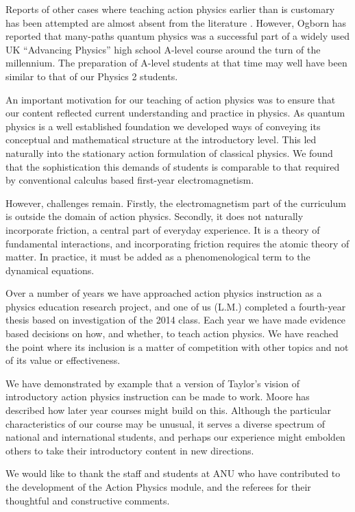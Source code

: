 \documentclass[prb,oncolumn,12pt]{revtex4-2}
\begin{document}
Reports of other cases where teaching action physics earlier than is customary has been attempted are almost absent from the literature \cite{Taylor2003}. However, Ogborn has reported that many-paths quantum physics was a successful part of a widely used UK ``Advancing Physics'' high school A-level course around the turn of the millennium. \cite{OgbornGirep2006} The preparation of A-level students at that time may well have been similar to that of our Physics 2 students.

An important motivation for our teaching of action physics was to ensure that our content reflected current understanding and practice in physics. As quantum physics is a well established foundation we developed ways of conveying its conceptual and mathematical structure at the introductory level. This led naturally into the stationary action formulation of classical physics. We found that the sophistication this demands of students is comparable to that required by conventional calculus based first-year electromagnetism.

However, challenges remain. Firstly, the electromagnetism part of the curriculum is outside the domain of action physics. Secondly, it does not naturally incorporate friction, a central part of everyday experience.  It is a theory of fundamental interactions, and incorporating friction requires the atomic theory of matter. In practice, it must be added as a phenomenological term to the dynamical equations. \cite{Goldstein}

Over a number of years we have approached action physics instruction as a physics education research project, \cite{McDermott} and one of us (L.M.) completed a fourth-year thesis based on investigation of the 2014 class. Each year we have made evidence based decisions on how, and whether, to teach action physics. We have reached the point where its inclusion is a matter of competition with other topics and not of its value or effectiveness. 

We have demonstrated by example that a version of Taylor's vision of introductory action physics instruction can be made to work. Moore has described how later year courses might build on this. \cite{Moore} Although the particular characteristics of our course may be unusual, it serves a diverse spectrum of national and international students, and perhaps our experience might embolden others to take their introductory content in new directions.

\begin{acknowledgments}

We would like to thank the staff and students at ANU who have contributed to the development of the Action Physics module, and the referees for their thoughtful and constructive comments.

\end{acknowledgments}
\end{document}
